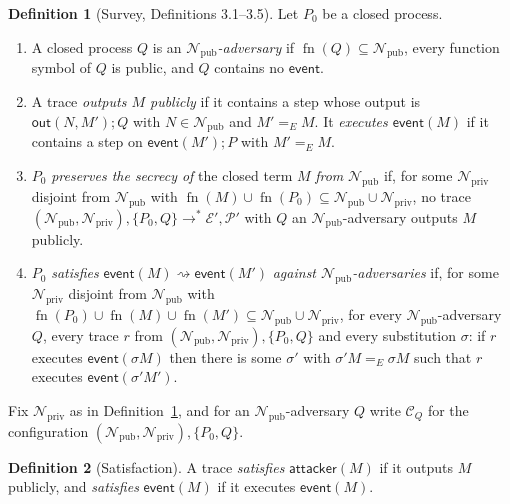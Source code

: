 \documentclass[11pt]{article}
\theoremstyle{definition}
\newtheorem{definition}{Definition}[section]
\theoremstyle{plain}
\theoremstyle{remark}
\newcommand{\fn}{\operatorname{fn}}
\newcommand{\red}[1]{\text{(Red #1)}}
\begin{document}
\begin{definition}[Survey, Definitions 3.1--3.5]\label{def:survey}
Let $P_0$ be a closed process.
\begin{enumerate}
\item A closed process $Q$ is an \textit{$\mathcal{N}_{\mathrm{pub}}$-adversary} if $\fn(Q)\subseteq\mathcal{N}_{\mathrm{pub}}$, every function symbol of $Q$ is public, and $Q$ contains no $\mathsf{event}$.
\item A trace \textit{outputs $M$ publicly} if it contains a step \red{I/O} whose output is $\mathsf{out}(N,M');Q$ with $N\in\mathcal{N}_{\mathrm{pub}}$ and $M'=_E M$. It \textit{executes $\mathsf{event}(M)$} if it contains a step \red{Event} on $\mathsf{event}(M');P$ with $M'=_E M$.
\item $P_0$ \textit{preserves the secrecy of} the closed term $M$ \textit{from} $\mathcal{N}_{\mathrm{pub}}$ if, for some $\mathcal{N}_{\mathrm{priv}}$ disjoint from $\mathcal{N}_{\mathrm{pub}}$ with $\fn(M)\cup\fn(P_0)\subseteq\mathcal{N}_{\mathrm{pub}}\cup\mathcal{N}_{\mathrm{priv}}$, no trace $(\mathcal{N}_{\mathrm{pub}},\mathcal{N}_{\mathrm{priv}}),\{P_0,Q\}\to^*\mathcal{E}',\mathcal{P}'$ with $Q$ an $\mathcal{N}_{\mathrm{pub}}$-adversary outputs $M$ publicly.
\item $P_0$ \textit{satisfies} $\mathsf{event}(M)\rightsquigarrow\mathsf{event}(M')$ \textit{against $\mathcal{N}_{\mathrm{pub}}$-adversaries} if, for some $\mathcal{N}_{\mathrm{priv}}$ disjoint from $\mathcal{N}_{\mathrm{pub}}$ with $\fn(P_0)\cup\fn(M)\cup\fn(M')\subseteq\mathcal{N}_{\mathrm{pub}}\cup\mathcal{N}_{\mathrm{priv}}$, for every $\mathcal{N}_{\mathrm{pub}}$-adversary $Q$, every trace $r$ from $(\mathcal{N}_{\mathrm{pub}},\mathcal{N}_{\mathrm{priv}}),\{P_0,Q\}$ and every substitution $\sigma$: if $r$ executes $\mathsf{event}(\sigma M)$ then there is some $\sigma'$ with $\sigma'M=_E\sigma M$ such that $r$ executes $\mathsf{event}(\sigma'M')$.
\end{enumerate}
\end{definition}

Fix $\mathcal{N}_{\mathrm{priv}}$ as in Definition~\ref{def:survey}, and for an $\mathcal{N}_{\mathrm{pub}}$-adversary $Q$ write $\mathcal{C}_Q$ for the configuration $(\mathcal{N}_{\mathrm{pub}},\mathcal{N}_{\mathrm{priv}}),\{P_0,Q\}$.

\begin{definition}[Satisfaction]\label{def:satisfies}
A trace \textit{satisfies} $\mathsf{attacker}(M)$ if it outputs $M$ publicly, and \textit{satisfies} $\mathsf{event}(M)$ if it executes $\mathsf{event}(M)$.
\end{definition}
\end{document}
